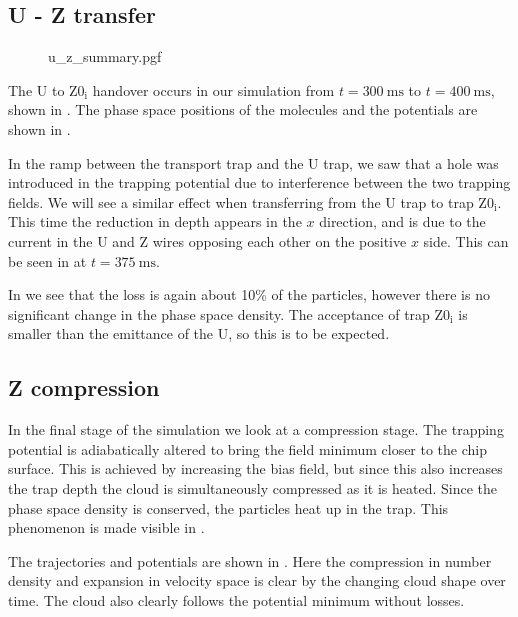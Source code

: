 \subsection{U - Z transfer}
\label{design:sim:U_to_Z0i}

\begin{figure}[p]
\centering
  {u_z_summary.pgf}
  \caption{
  }
  \label{design:fig:uzsum}
\end{figure}

The U to $\mathrm{Z0_i}$ handover occurs in our simulation from
$t=\SI{300}{\milli\second}$ to $t=\SI{400}{\milli\second}$, shown in
.  The phase space positions of the
molecules and the potentials are shown in .

In the ramp between the transport trap and the U trap, we saw that a hole was
introduced in the trapping potential due to interference between the two
trapping fields. We will see a similar effect when transferring from the U trap
to trap $\mathrm{Z0_i}$.  This time the reduction in depth appears in the $x$
direction, and is due to the current in the U and Z wires opposing each other
on the positive $x$ side. This can be seen in  at
$t=\SI{375}{\milli\second}$.

In  we see that the loss is again about 10\% of
the particles, however there is no significant change in the phase space
density. The acceptance of trap $\mathrm{Z0_i}$ is smaller than the emittance
of the U, so this is to be expected.

\subsection{Z compression}


In the final stage of the simulation we look at a compression stage. The
trapping potential is adiabatically altered to bring the field minimum closer
to the chip surface. This is achieved by increasing the bias field, but since
this also increases the trap depth the cloud is simultaneously compressed as it
is heated. Since the phase space density is conserved, the particles heat up in
the trap. This phenomenon is made visible in
.

The trajectories and potentials are shown in .
Here the compression in number density and expansion in velocity space is clear
by the changing cloud shape over time. The cloud also clearly follows the
potential minimum without losses.


